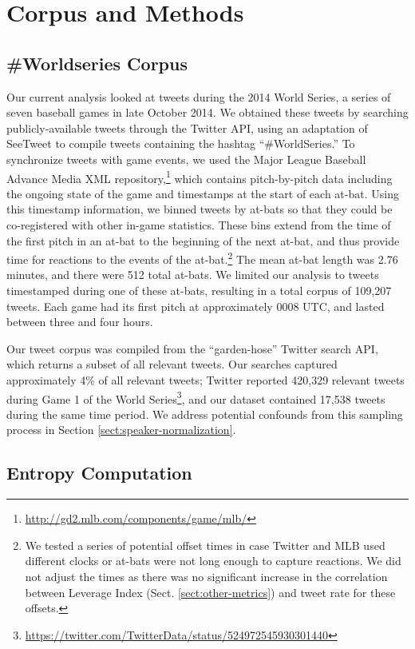\documentclass[11pt,letterpaper]{article}
\begin{document}
\section{Corpus and Methods}

\subsection{\#Worldseries Corpus}

Our current analysis looked at tweets during the 2014 World Series, a series of seven baseball games in late October 2014.  We obtained these tweets by searching publicly-available tweets through the Twitter API, using an adaptation of SeeTweet \cite{doyle2014} to compile tweets containing the hashtag ``\#WorldSeries.''  To synchronize tweets with game events, we used the Major League Baseball Advance Media XML repository,\footnote{\url{http://gd2.mlb.com/components/game/mlb/}} which contains pitch-by-pitch data including the ongoing state of the game and timestamps at the start of each at-bat. Using this timestamp information, we binned tweets by at-bats so that they could be co-registered with other in-game statistics.  These bins extend from the time of the first pitch in an at-bat to the beginning of the next at-bat, and thus provide time for reactions to the events of the at-bat.\footnote{We tested a series of potential offset times in case Twitter and MLB used different clocks or at-bats were not long enough to capture reactions. We did not adjust the times as there was no significant increase in the correlation between Leverage Index (Sect. \ref{sect:other-metrics}) and tweet rate for these offsets.}  The mean at-bat length was 2.76 minutes, and there were 512 total at-bats.  We limited our analysis to tweets timestamped during one of these at-bats, resulting in a total corpus of 109,207 tweets. Each game had its first pitch at approximately 0008 UTC, and lasted between three and four hours.

Our tweet corpus was compiled from the ``garden-hose'' Twitter search API, which returns a subset of all relevant tweets. Our searches captured approximately 4\% of all relevant tweets; Twitter reported 420,329 relevant tweets during Game 1 of the World Series\footnote{\url{https://twitter.com/TwitterData/status/524972545930301440}}, and our dataset contained 17,538 tweets during the same time period.  We address potential confounds from this sampling process in Section \ref{sect:speaker-normalization}.

\subsection{Entropy Computation}
\end{document}
